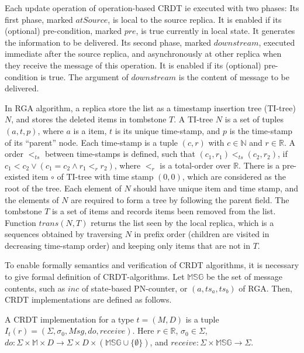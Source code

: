 Each update operation of operation-based CRDT ie executed with two phases: Its first phase, marked $\mathit{atSource}$, is local to the source replica. It is enabled if its (optional) pre-condition, marked $\mathit{pre}$, is true currently in local state. It generates the information to be delivered. Its second phase, marked $\mathit{downstream}$, executed immediate after the source replica, and asynchronously at other replica when they receive the message of this operation. It is enabled if its (optional) pre-condition is true. The argument of $\mathit{downstream}$ is the content of message to be delivered. 

In RGA algorithm, a replica store the list as a timestamp insertion tree (TI-tree) $N$, and stores the deleted items in tombstone $T$. A TI-tree $N$ is a set of tuples $(a,t,p)$, where $a$ is a item, $t$ is its unique time-stamp, and $p$ is the time-stamp of its ``parent'' node. Each time-stamp is a tuple $(c,r)$ with $c \in \mathbb{N}$ and $r \in \mathbb{R}$. A order $<_{\mathit{ts}}$ between time-stamps is defined, such that $(c_1,r_1) <_{\mathit{ts}} (c_2,r_2)$, if $c_1 < c_2 \vee (c_1 = c_2 \wedge r_1 <_r r_2)$, where $<_r$ is a total-order over $\mathbb{R}$. There is a pre-existed item $\circ$ of TI-tree with time stamp $(0,0)$, which are considered as the root of the tree. Each element of $N$ should have unique item and time stamp, and the elements of $N$ are required to form a tree by following the parent field. The tombstone $T$ is a set of items and records items been removed from the list. Function $\mathit{trans}(N,T)$ returns the list seen by the local replica, which is a sequences obtained by traversing $N$ in prefix order (children are visited in decreasing time-stamp order) and keeping only items that are not in $T$.

To enable formally semantics and verification of CRDT algorithms, it is necessary to give formal definition of CRDT-algorithms. Let $\mathbb{MSG}$ be the set of message contents, such as $inc$ of state-based PN-counter, or $(a,ts_a,ts_b)$ of RGA. Then, CRDT implementations are defined as follows.

\begin{definition}
\label{definition:CRDT implementations}
A CRDT implementation for a type $t = (M,D)$ is a tuple $I_t(r) = (\Sigma, \sigma_0, \mathit{Msg}, \mathit{do},\mathit{receive})$. Here $r \in \mathbb{R}$, $\sigma_0 \in \Sigma$, $\mathit{do}:\Sigma \times \mathbb{M} \times D \rightarrow \Sigma \times D \times (\mathbb{MSG} \cup \{ \emptyset \} )$, and $\mathit{receive}: \Sigma \times \mathbb{MSG} \rightarrow \Sigma$.
\end{definition}

